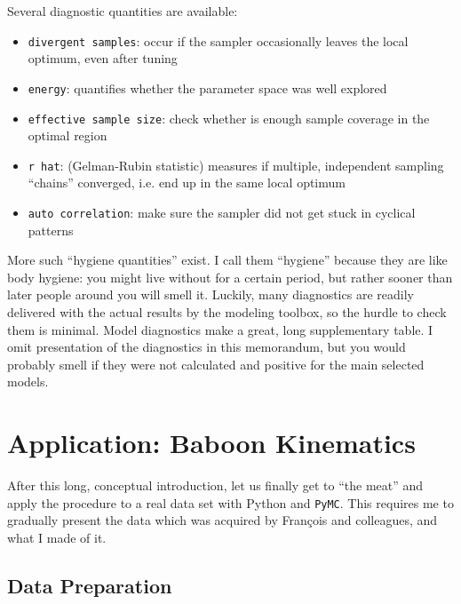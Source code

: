 Several diagnostic quantities are available:
\begin{itemize}
\item \texttt{divergent samples}: occur if the sampler occasionally leaves the local optimum, even after tuning
\item \texttt{energy}: quantifies whether the parameter space was well explored
\item \texttt{effective sample size}: check whether is enough sample coverage in the optimal region
\item \texttt{r hat}: (Gelman-Rubin statistic) measures if multiple, independent sampling ``chains'' converged, i.e. end up in the same local optimum
\item \texttt{auto correlation}: make sure the sampler did not get stuck in cyclical patterns
\end{itemize}

More such ``hygiene quantities'' exist.
I call them ``hygiene'' because they are like body hygiene: you might live without for a certain period, but rather sooner than later people around you will smell it.
Luckily, many diagnostics are readily delivered with the actual results by the modeling toolbox, so the hurdle to check them is minimal.
Model diagnostics make a great, long supplementary table.
I omit presentation of the diagnostics in this memorandum, but you would probably smell if they were not calculated and positive for the main selected models.

\FloatBarrier
\clearpage
\section{Application: Baboon Kinematics}
\label{sec:orge39e02f}
After this long, conceptual introduction, let us finally get to ``the meat'' and apply the procedure to a real data set with Python and \texttt{PyMC}.
This requires me to gradually present the data which was acquired by François and colleagues, and what I made of it.

\subsection{Data Preparation}
\label{sec:orgeaaa58c}
